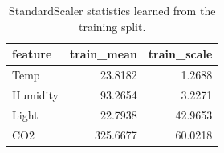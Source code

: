 \begin{table}
\caption{StandardScaler statistics learned from the training split.}
\label{tab:scaler}
\begin{tabular}{lrr}
\toprule
feature & train\_mean & train\_scale \\
\midrule
Temp & 23.8182 & 1.2688 \\
Humidity & 93.2654 & 3.2271 \\
Light & 22.7938 & 42.9653 \\
CO2 & 325.6677 & 60.0218 \\
\bottomrule
\end{tabular}
\end{table}
